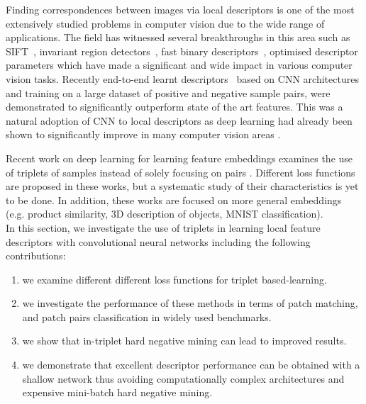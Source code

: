 Finding correspondences between images via local descriptors is one of the most extensively studied problems in computer vision due to the wide range of applications. The field has witnessed several
breakthroughs in this area such as SIFT~\cite{Lowe:2004:DIF:993451.996342}, invariant region
detectors~\cite{mikolajczykIJCV2004}, fast binary
descriptors~\cite{Calonder:2010:BBR:1888089.1888148}, optimised
descriptor parameters \cite{WHB09,simonyan2014learning} which have
made a significant and wide impact in various computer vision tasks.
Recently end-to-end learnt
descriptors~\cite{FDB14,simo2015deepdesc,ZagoruykoCVPR2015,Han_2015_CVPR}
based on CNN architectures and training on a large dataset of positive
and negative sample pairs, were demonstrated to significantly
outperform state of the art features. This was a natural adoption of
CNN to local descriptors as deep learning had already been shown to
significantly improve in many computer vision areas
\cite{lecun2015deep}.

Recent work on deep learning for learning feature embeddings examines
the use of triplets of samples instead of solely focusing on pairs
\cite{DBLP:journals/corr/WangSLRWPCW14,DBLP:journals/corr/HofferA14,wohlhart15}.
Different loss functions are proposed in these works, but a systematic
study of their characteristics is yet to be done. In addition, these
works are focused on more general embeddings (e.g. product similarity,
3D description of objects, MNIST classification).\\

\noindent In this section, we investigate the use of triplets in learning local feature descriptors with convolutional neural networks including the following contributions:

\begin{enumerate}
    \item we examine different different loss functions for triplet based-learning.
    \item we investigate the performance of these methods in terms of patch matching, and patch pairs classification in widely used benchmarks.
    \item we show that in-triplet hard negative mining can lead to improved results.
    \item we demonstrate that excellent descriptor performance can be obtained with a shallow network thus avoiding computationally complex architectures and expensive mini-batch hard negative mining.
\end{enumerate}

